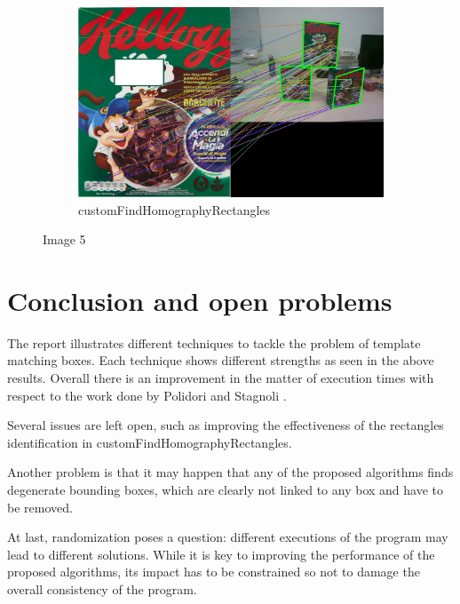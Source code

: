 \documentclass{article}
\begin{document}
\begin{figure}[H]
\begin{subfigure}[b]{0.3\textwidth}
     \end{subfigure}
     \hfill
     \begin{subfigure}[b]{0.3\textwidth}
         \centering
         \includegraphics[width=\textwidth]{image/barchette_5_rettangoli.jpg}
         \caption{customFindHomographyRectangles}
         \label{fig:customFindHomographyRectangles}
     \end{subfigure}
     \hfill
        \caption{Image 5}
        \label{fig:image 5}
\end{figure}

\section{Conclusion and open problems}
The report illustrates different techniques to tackle the problem of template matching boxes. Each technique shows different strengths as seen in the above results. Overall there is an improvement in the matter of execution times with respect to the work done by Polidori and Stagnoli \cite{polidori_stagnoli_2022}.

Several issues are left open, such as improving the effectiveness of the rectangles identification in customFindHomographyRectangles.

Another problem is that it may happen that any of the proposed algorithms finds degenerate bounding boxes, which are clearly not linked to any box and have to be removed.

At last, randomization poses a question: different executions of the program may lead to different solutions. While it is key to improving the performance of the proposed algorithms, its impact has to be constrained so not to damage the overall consistency of the program.\\
\\
\printbibliography
\end{document}
